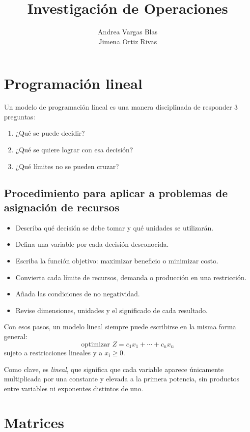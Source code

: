 \documentclass[12pt,a4paper]{article}
\title{Investigación de Operaciones}
\author{Andrea Vargas Blas \\ Jimena Ortiz Rivas}
\date{}
\begin{document}
\maketitle

\section{Programación lineal}

Un modelo de programación lineal es una manera disciplinada de responder 3 preguntas:
\begin{enumerate}
    \item ¿Qué se puede decidir?
    \item ¿Qué se quiere lograr con esa decisión?
    \item ¿Qué límites no se pueden cruzar?
\end{enumerate}

\subsection{Procedimiento para aplicar a problemas de asignación de recursos}
\begin{itemize}
    \item Describa qué decisión se debe tomar y qué unidades se utilizarán.
    \item Defina una variable por cada decisión desconocida.
    \item Escriba la función objetivo: maximizar beneficio o minimizar costo.
    \item Convierta cada límite de recursos, demanda o producción en una restricción.
    \item Añada las condiciones de no negatividad.
    \item Revise dimensiones, unidades y el significado de cada resultado.
\end{itemize}

Con esos pasos, un modelo lineal siempre puede escribirse en la misma forma general:
\[
\text{optimizar } Z=c_1x_1+\cdots+c_nx_n
\]
sujeto a restricciones lineales y a \(x_i\geq 0\).

Como clave, es \emph{lineal}, que significa que cada variable aparece únicamente multiplicada por una constante y elevada a la primera potencia, sin productos entre variables ni exponentes distintos de uno.

\section{Matrices}
\end{document}
